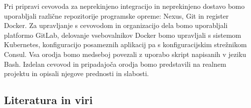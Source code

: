 \documentclass[a4paper, 12pt]{article}
\newcommand\cmnt[1]{\textcolor{munsell}{#1}}
\begin{document}
Pri pripravi cevovoda za neprekinjeno integracijo in neprekinjeno dostavo bomo uporabljali različne repozitorije programske opreme: Nexus, Git in register Docker. Za upravljanje s cevovodom in organizacijo dela bomo uporabljali platformo GitLab, delovanje vsebovalnikov Docker bomo upravljali s sistemom Kubernetes, konfiguracijo posameznih aplikacij pa s konfiguracijskim strežnikom Consul. Vsa orodja bomo medseboj povezali z uporabo skript napisanih v jeziku Bash. Izdelan cevovod in pripadajoča orodja bomo predstavili na realnem projektu in opisali njegove prednosti in slabosti.

\subsection{Literatura in viri}
\label{literatura}


\renewcommand\refname{}
\vspace{-50px}




%
\end{document}
